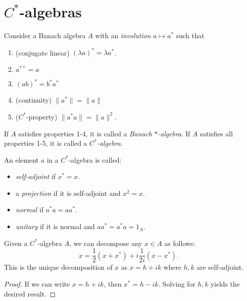 \documentclass[12pt]{article}
\begin{document}


\section{$C^\ast$-algebras} %

\begin{definition}
	Consider a Banach algebra $A$ with an \emph{involution} $a\mapsto a^\ast$ such that 
	\begin{enumerate}
		\item (conjugate linear) $(\lambda a)^\ast = \overline{\lambda}a^\ast$.
		\item $a^{\ast\ast}=a$
		\item $(ab)^\ast = b^\ast a^\ast$
		\item (continuity) $\|a^\ast\| = \|a\|$
		\item ($C^\ast$-property) $\|a^\ast a\| = \|a\|^2$.
	\end{enumerate}
	If $A$ satisfies properties 1-4, it is called a \emph{Banach $\ast$-algebra}. If $A$ satisfies all properties 1-5, it is called a \emph{$C^\ast$-algebra}.
\end{definition}

\begin{definition}
	An element $a$ in a $C^\ast$-algebra is called:
	\begin{itemize}
		\item \emph{self-adjoint} if $x^\ast = x$.
		\item a \emph{projection} if it is self-adjoint and $x^2=x$.
		\item \emph{normal} if $a^\ast a=aa^\ast$.
		\item \emph{unitary} if it is normal and $aa^\ast=a^\ast a=1_A$.
	\end{itemize}
\end{definition}

\begin{corollary}
\label{cor_real_imaginary_decomposition}
	Given a $C^\ast$-algebra $A$, we can decompose any $x\in A$ as follows:
	\begin{equation*}
		x = \frac{1}{2}(x+x^\ast) + i\frac{1}{2i}(x-x^\ast).
	\end{equation*}
	This is the unique decomposition of $x$ as $x=h+ik$ where $h,k$ are self-adjoint.
\end{corollary}
\begin{proof}
	If we can write $x=h+ik$, then $x^\ast=h-ik$. Solving for $h,k$ yields the desired result.
\end{proof}
\end{document}
